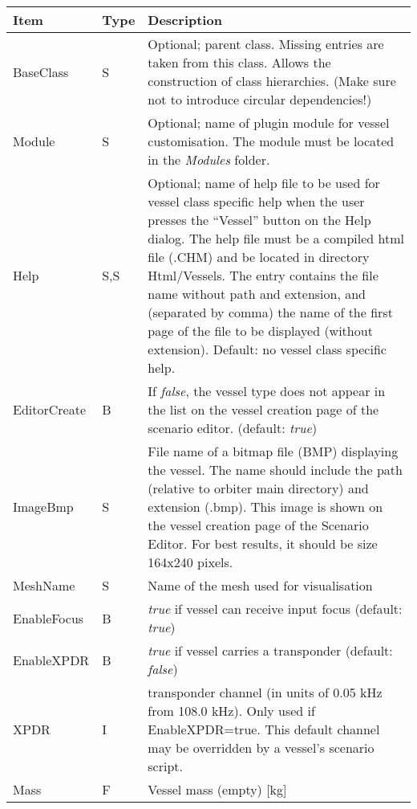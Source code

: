 \documentclass[Orbiter Developer Manual.tex]{subfiles}
\begin{document}
	\begin{longtable}{ |p{}|p{}|p{}| }
	\hline\rule{0pt}{2ex}
	\textbf{Item} & \textbf{Type} & \textbf{Description}\\
	\hline\rule{0pt}{2ex}
	BaseClass & S & Optional; parent class. Missing entries are taken from this class. Allows the construction of class hierarchies. (Make sure not to introduce circular dependencies!)\\
	\hline\rule{0pt}{2ex}
	Module & S & Optional; name of plugin module for vessel customisation. The module must be located in the \textit{Modules} folder.\\
	\hline\rule{0pt}{2ex}
	Help & S,S & Optional; name of help file to be used for vessel class specific help when the user presses the “Vessel” button on the Help dialog. The help file must be a compiled html file (.CHM) and be located in directory Html/Vessels. The entry contains the file name without path and extension, and (separated by comma) the name of the first page of the file to be displayed (without extension). Default: no vessel class specific help.\\
	\hline\rule{0pt}{2ex}
	EditorCreate & B & If \textit{false}, the vessel type does not appear in the list on the vessel creation page of the scenario editor. (default: \textit{true})\\
	\hline\rule{0pt}{2ex}
	ImageBmp & S & File name of a bitmap file (BMP) displaying the vessel. The name should include the path (relative to orbiter main directory) and extension (.bmp). This image is shown on the vessel creation page of the Scenario Editor. For best results, it should be size 164x240 pixels.\\
	\hline\rule{0pt}{2ex}
	MeshName & S & Name of the mesh used for visualisation\\
	\hline\rule{0pt}{2ex}
	EnableFocus & B & \textit{true} if vessel can receive input focus (default: \textit{true})\\
	\hline\rule{0pt}{2ex}
	EnableXPDR & B & \textit{true} if vessel carries a transponder (default: \textit{false})\\
	\hline\rule{0pt}{2ex}
	XPDR & I & transponder channel (in units of 0.05 kHz from 108.0 kHz). Only used if EnableXPDR=true. This default channel may be overridden by a vessel’s scenario script.\\
	\hline\rule{0pt}{2ex}
	Mass & F & Vessel mass (empty) [kg]\\

\end{longtable}
\end{document}
